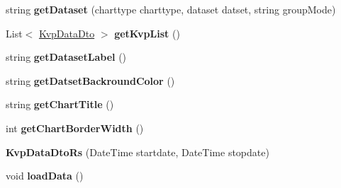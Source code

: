 \begin{DoxyCompactItemize}
string {\bfseries get\+Dataset} (charttype charttype, dataset datset, string group\+Mode)
\item 
\mbox{\label{classkpi_mvc_api_1_1_data_transfer_objects_1_1_kvp_data_dto_rs_ac1bd4b0312a7a0a07b8848d9cdf739da}} 
List$<$ \hyperlink{classkpi_mvc_api_1_1_data_transfer_objects_1_1_kvp_data_dto}{Kvp\+Data\+Dto} $>$ {\bfseries get\+Kvp\+List} ()
\item 
\mbox{\label{classkpi_mvc_api_1_1_data_transfer_objects_1_1_kvp_data_dto_rs_a29e122aca7de38b447056485ad8b4afa}} 
string {\bfseries get\+Dataset\+Label} ()
\item 
\mbox{\label{classkpi_mvc_api_1_1_data_transfer_objects_1_1_kvp_data_dto_rs_ac08415561811e16a01e4fa425709905b}} 
string {\bfseries get\+Datset\+Backround\+Color} ()
\item 
\mbox{\label{classkpi_mvc_api_1_1_data_transfer_objects_1_1_kvp_data_dto_rs_ac1a9b5ca7012ddd12549e157929f23e7}} 
string {\bfseries get\+Chart\+Title} ()
\item 
\mbox{\label{classkpi_mvc_api_1_1_data_transfer_objects_1_1_kvp_data_dto_rs_afcb6b42bf6a7f8271efc95f671bc9e08}} 
int {\bfseries get\+Chart\+Border\+Width} ()
\item 
\mbox{\label{classkpi_mvc_api_1_1_data_transfer_objects_1_1_kvp_data_dto_rs_a4d9df8d729c0009c23968a0250d45dcc}} 
{\bfseries Kvp\+Data\+Dto\+Rs} (Date\+Time startdate, Date\+Time stopdate)
\item 
\mbox{\label{classkpi_mvc_api_1_1_data_transfer_objects_1_1_kvp_data_dto_rs_a562207c4315e1f552734257d994cc2d5}} 
void {\bfseries load\+Data} ()
\item 
\mbox{\label{classkpi_mvc_api_1_1_data_transfer_objects_1_1_kvp_data_dto_rs_afbda5e8db6a5f8b25125d2a6b6dcf7e1}} 

\end{DoxyCompactItemize}
